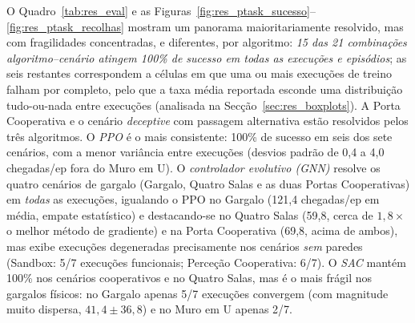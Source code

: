 \documentclass[12pt,reqno, twoside]{amsbook}
\theoremstyle{plain}
\numberwithin{equation}{chapter}
\numberwithin{section}{chapter}
\numberwithin{table}{chapter}
\numberwithin{figure}{chapter}
\begin{document}
O Quadro~\ref{tab:res_eval} e as Figuras~\ref{fig:res_ptask_sucesso}--\ref{fig:res_ptask_recolhas} mostram um panorama maioritariamente resolvido, mas com fragilidades concentradas, e diferentes, por algoritmo: \emph{15 das 21 combinações algoritmo--cenário atingem 100\% de sucesso em todas as execuções e episódios}; as seis restantes correspondem a células em que uma ou mais execuções de treino falham por completo, pelo que a taxa média reportada esconde uma distribuição tudo-ou-nada entre execuções (analisada na Secção~\ref{sec:res_boxplots}). A Porta Cooperativa e o cenário \textit{deceptive} com passagem alternativa estão resolvidos pelos três algoritmos. O \emph{PPO} é o mais consistente: 100\% de sucesso em seis dos sete cenários, com a menor variância entre execuções (desvios padrão de 0,4 a 4,0 chegadas/ep fora do Muro em U). O \emph{controlador evolutivo (GNN)} resolve os quatro cenários de gargalo (Gargalo, Quatro Salas e as duas Portas Cooperativas) em \emph{todas} as execuções, igualando o PPO no Gargalo (121,4 chegadas/ep em média, empate estatístico) e destacando-se no Quatro Salas (59,8, cerca de $1{,}8\times$ o melhor método de gradiente) e na Porta Cooperativa (69,8, acima de ambos), mas exibe execuções degeneradas precisamente nos cenários \emph{sem} paredes (Sandbox: 5/7 execuções funcionais; Perceção Cooperativa: 6/7). O \emph{SAC} mantém 100\% nos cenários cooperativos e no Quatro Salas, mas é o mais frágil nos gargalos físicos: no Gargalo apenas 5/7 execuções convergem (com magnitude muito dispersa, $41{,}4 \pm 36{,}8$) e no Muro em U apenas 2/7.
\end{document}
